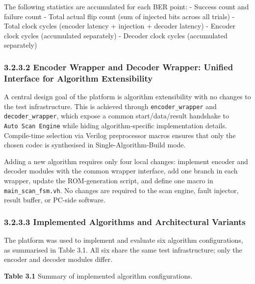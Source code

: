 \documentclass[
  english,
  12pt,
]{report}
\begin{document}
The following statistics are accumulated for each BER point: - Success
count and failure count - Total actual flip count (sum of injected bits
across all trials) - Total clock cycles (encoder latency + injection +
decoder latency) - Encoder clock cycles (accumulated separately) -
Decoder clock cycles (accumulated separately)

\subsubsection{3.2.3.2 Encoder Wrapper and Decoder Wrapper: Unified
Interface for Algorithm
Extensibility}\label{encoder-wrapper-and-decoder-wrapper-unified-interface-for-algorithm-extensibility}

A central design goal of the platform is algorithm extensibility with no
changes to the test infrastructure. This is achieved through
\texttt{encoder\_wrapper} and \texttt{decoder\_wrapper}, which expose a
common start/data/result handshake to \texttt{Auto\ Scan\ Engine} while
hiding algorithm-specific implementation details. Compile-time selection
via Verilog preprocessor macros ensures that only the chosen codec is
synthesised in Single-Algorithm-Build mode.

Adding a new algorithm requires only four local changes: implement
encoder and decoder modules with the common wrapper interface, add one
branch in each wrapper, update the ROM-generation script, and define one
macro in \texttt{main\_scan\_fsm.vh}. No changes are required to the
scan engine, fault injector, result buffer, or PC-side software.

\subsubsection{3.2.3.3 Implemented Algorithms and Architectural
Variants}\label{implemented-algorithms-and-architectural-variants}

The platform was used to implement and evaluate six algorithm
configurations, as summarised in Table 3.1. All six share the same test
infrastructure; only the encoder and decoder modules differ.

\textbf{Table 3.1} Summary of implemented algorithm configurations.
\end{document}
